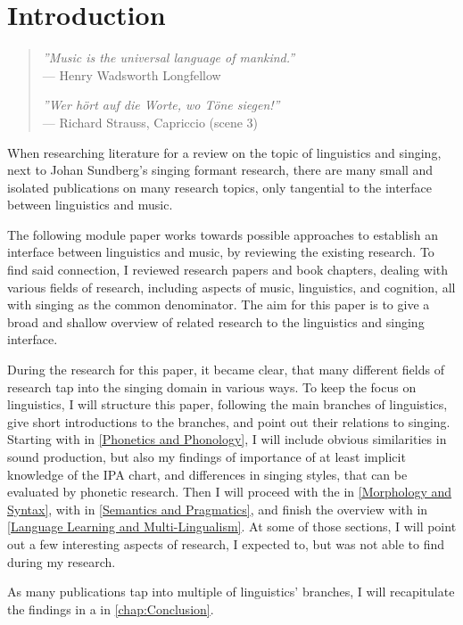 \chapter{Introduction}
\label{chap:Introduction}

\begin{quote}
\textit{''Music is the universal language of mankind.''}
\\--- Henry Wadsworth Longfellow

\textit{''Wer hört auf die Worte, wo Töne siegen!''} 
\\--- Richard Strauss, Capriccio (scene 3)
\end{quote}


\vspace{1cm}


When researching literature for a review on the topic of linguistics and singing, next to Johan Sundberg's singing formant research, there are many small and isolated publications on many research topics, only tangential to the interface between linguistics and music.

The following module paper works towards possible approaches to establish an interface between linguistics and music, by reviewing the existing research.
To find said connection, I reviewed research papers and book chapters, dealing with various fields of research, including aspects of music, linguistics, and cognition, all with singing as the common denominator. The aim for this paper is to give a broad and shallow overview of related research to the linguistics and singing interface.

During the research for this paper, it became clear, that many different fields of research tap into the singing domain in various ways. To keep the focus on  linguistics, I will structure this paper, following the main branches of linguistics, give short introductions to the branches, and point out their relations to singing. Starting with   in \autoref{Phonetics and Phonology}, I will include obvious similarities in sound production, but also my findings of importance of at least implicit knowledge of the IPA chart, and differences in singing styles, that can be evaluated by phonetic research. Then I will proceed with the  in \autoref{Morphology and Syntax}, with  in \autoref{Semantics and Pragmatics}, and finish the overview with  in \autoref{Language Learning and Multi-Lingualism}.  At some of those sections, I will point out a few interesting aspects of research, I expected to, but was not able to find during my research.

As many publications tap into multiple of linguistics' branches, I will recapitulate the findings in a  in \autoref{chap:Conclusion}.